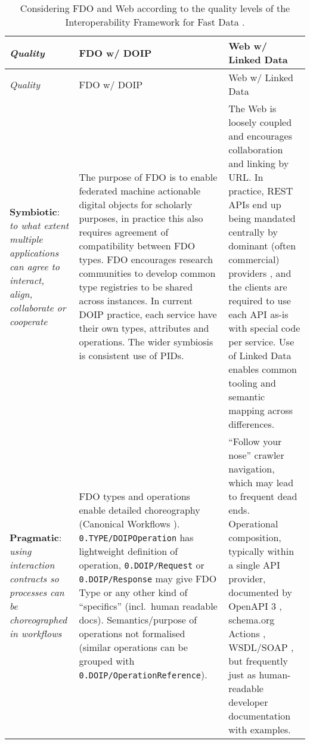 \renewcommand*{\arraystretch}{1.4}
\begin{longtable}[]{@{}
  >{\raggedright\arraybackslash}p{}
  >{\arraybackslash}p{}
  >{\arraybackslash}p{}@{}}
\caption[Considering FDO and Web according to Interoperability Framework for Fast Data]{Considering FDO and Web according to the quality levels of the Interoperability Framework for Fast Data \cite{delgadoInteroperabilityFrameworkDistributed2016a}.
\label{ch3:fdo-web-interoperability-framework}}\tabularnewline
\toprule
\emph{Quality} & 
FDO w/ DOIP & 
Web w/ Linked Data \\
\midrule
\endfirsthead
\toprule
\emph{Quality} & 
FDO w/ DOIP & 
Web w/ Linked Data \\
\midrule
\endhead
\textbf{Symbiotic}: \emph{to what extent multiple applications can agree to interact, align, collaborate or cooperate}
  & The purpose of FDO is to enable federated machine actionable digital objects for scholarly purposes, in practice this also requires agreement of compatibility between FDO types. FDO encourages research communities to develop common type registries to be shared across instances. In current DOIP practice, each service have their own types, attributes and operations. The wider symbiosis is consistent use of PIDs.
  & The Web is loosely coupled and encourages collaboration and linking by URL. In practice, REST APIs \cite{fieldingArchitecturalStylesDesign2000a} end up being mandated centrally by dominant (often commercial) providers \cite{fieldingReflectionsRESTArchitectural2017a}, and the clients are required to use each API as-is with special code per service. Use of Linked Data enables common tooling and semantic mapping across differences. \\
\textbf{Pragmatic}: \emph{using interaction contracts so processes can be choreographed in workflows}
  & FDO types and operations enable detailed choreography (Canonical Workflows \cite{cwfr}). \texttt{0.TYPE/DOIPOperation} has lightweight definition of operation, \texttt{0.DOIP/Request} or \texttt{0.DOIP/Response} may give FDO Type or any other kind of ``specifics'' (incl.~human readable docs). Semantics/purpose of operations not formalised (similar operations can be grouped with \texttt{0.DOIP/OperationReference}).
  & ``Follow your nose'' crawler navigation, which may lead to frequent dead ends. Operational composition, typically within a single API provider, documented by OpenAPI 3 \cite{OpenAPISpecificationV3}, schema.org Actions \cite{SchemaOrgActions}, WSDL/SOAP \cite{w3-wsdl20-primer}, but frequently just as human-readable developer documentation with examples. \\

\end{longtable}
